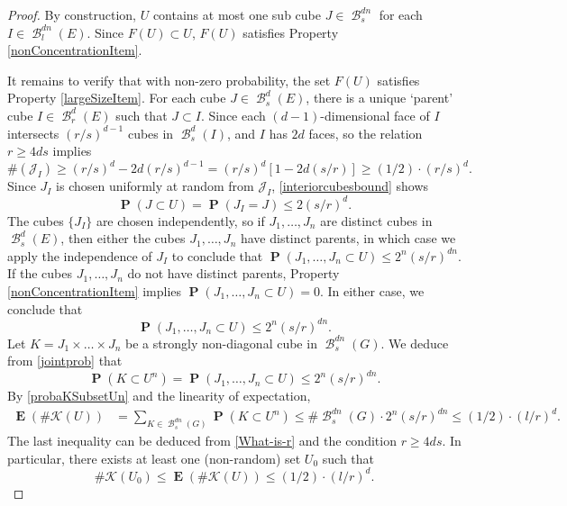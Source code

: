 \documentclass[dvipsnames,letterpaper,12pt]{article}
\numberwithin{equation}{section}
\theoremstyle{plain}
\theoremstyle{remark}
\DeclareMathOperator{\prob}{\mathbf{P}}
\DeclareMathOperator{\expect}{\mathbf{E}}
\DeclareMathOperator{\B}{\mathcal{B}}
\begin{document}
\begin{proof}
	By construction, $U$ contains at most one sub cube $J \in \B^{dn}_s$ for each $I \in \B^{dn}_l(E)$. Since $F(U) \subset U$, $F(U)$ satisfies Property \ref{nonConcentrationItem}.

	It remains to verify that with non-zero probability, the set $F(U)$ satisfies Property \ref{largeSizeItem}. For each cube $J \in \B_s^d(E)$, there is a unique `parent' cube $I \in \B_r^d(E)$ such that $J \subset I$. Since each $(d-1)$-dimensional face of $I$ intersects $(r/s)^{d-1}$ cubes in $\B_s^d(I)$, and $I$ has $2d$ faces, so the relation $r \geq 4ds$ implies
	\begin{equation} \label{interiorcubesbound}
		\#(\mathcal{J}_I) \geq (r/s)^d - 2d (r/s)^{d-1} = (r/s)^d[1 - 2d(s/r)] \geq (1/2) \cdot (r/s)^d.
	\end{equation}
	Since $J_I$ is chosen uniformly at random from $\mathcal{J}_I$, \eqref{interiorcubesbound} shows
	\[ \prob(J \subset U) = \prob(J_I = J) \leq 2 (s/r)^d. \]
	The cubes $\{ J_I \}$ are chosen independently, so if $J_1, \dots, J_n$ are distinct cubes in $\B^d_s(E)$, then either the cubes $J_1, \dots, J_n$ have distinct parents, in which case we apply the independence of $J_I$ to conclude that $\prob(J_1, \dots, J_n \subset U) \leq 2^n (s/r)^{dn}$. If the cubes $J_1, \dots, J_n$ do not have distinct parents, Property \ref{nonConcentrationItem} implies $\prob(J_1, \dots, J_n \subset U) = 0$. In either case, we conclude that
	\begin{equation}\label{jointprob}
	\prob(J_1, \dots, J_n \subset U) \leq 2^n (s/r)^{dn}.
	\end{equation}
	Let $K = J_1 \times \dots \times J_n$ be a strongly non-diagonal cube in $\B^{dn}_s(G)$. We deduce from \eqref{jointprob} that
	\begin{equation}\label{probaKSubsetUn}
		\prob(K \subset U^n) = \prob(J_1, \dots, J_n \subset U) \leq 2^n (s/r)^{dn}.
	\end{equation}
	By \eqref{probaKSubsetUn} and the linearity of expectation,
	\begin{align*}
		\expect(\# \mathcal{K}(U)) &= \sum_{K \in \B^{dn}_s(G)} \prob(K \subset U^n) \leq \# \B_s^{dn}(G) \cdot 2^n (s/r)^{dn} \leq (1/2) \cdot (l/r)^d.
	\end{align*}
	 The last inequality can be deduced from \eqref{What-is-r} and the condition $r \geq 4ds$. 
	In particular, there exists at least one (non-random) set $U_0$ such that
	\begin{equation}\label{KU0Small}
		\# \mathcal{K}(U_0) \leq \expect(\# \mathcal{K}(U)) \leq (1/2) \cdot (l/r)^d.

\end{equation}
\end{proof}
\end{document}
